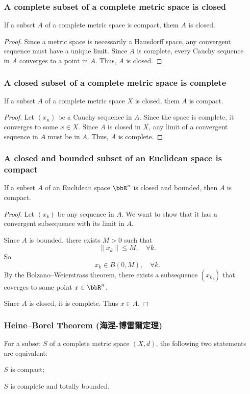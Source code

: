 \documentclass[a4paper,12pt]{article}
\begin{document}
\subsubsection{A complete subset of a complete metric space is closed}
If a subset $A$ of a complete metric space is compact, them $A$ is closed.
\begin{proof}
Since a metric space is necessarily a Hausdorff space, any convergent sequence must have a unique limit. Since $A$ is complete, every Cauchy sequence in $A$ converges to a point in $A$. Thus, $A$ is closed.
\end{proof}
\subsubsection{A closed subset of a complete metric space is complete}
If a subset $A$ of a complete metric space $X$ is closed, them $A$ is compact.
\begin{proof}
Let $(x_n)$ be a Cauchy sequence in $A$. Since the space is complete, it converges to some $x\in X$. Since $A$ is closed in $X$, any limit of a convergent sequence in $A$ must be in $A$. Thus, $A$ is complete.
\end{proof}
\subsubsection{A closed and bounded subset of an Euclidean space is compact}
If a subset $A$ of an Euclidean space $\bbR^n$ is closed and bounded, then $A$ is compact.
\begin{proof}
Let $(x_k)$ be any sequence in $A$. We want to show that it has a convergent subsequence with its limit in $A$.

Since $A$ is bounded, there exists $M>0$ such that
    \[\|x_k\|\leq M,\quad\forall k.\]
    So
    \[x_k\in B(0,M),\quad\forall k.\]
    By the Bolzano–Weierstrass theorem, there exists a subsequence $(x_{k_j})$ that coverges to some point $x\in\bbR^n$.
    
    Since $A$ is closed, it is complete. Thus $x\in A$.
\end{proof}
\subsubsection{Heine–Borel Theorem (海涅-博雷爾定理)}
For a subset $S$ of a complete metric space $(X,d)$, the following two statements are equivalent:
\bit
\item $S$ is compact;
\item $S$ is complete and totally bounded.
\eit
\end{document}
